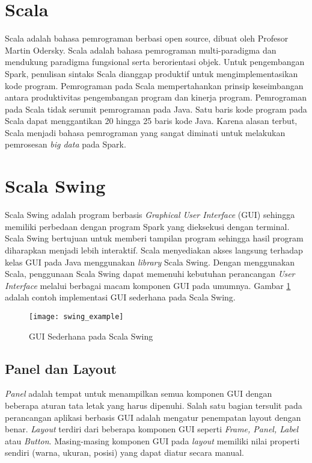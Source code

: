 \section{Scala}
\label{sec:scala}
Scala adalah bahasa pemrograman berbasi open source, dibuat oleh Profesor Martin Odersky. Scala adalah bahasa pemrograman multi-paradigma dan mendukung paradigma fungsional serta berorientasi objek. Untuk pengembangan Spark, penulisan sintaks Scala dianggap produktif untuk mengimplementasikan kode program. Pemrograman pada Scala mempertahankan prinsip keseimbangan antara produktivitas pengembangan program dan kinerja program. Pemrograman pada Scala tidak serumit pemrograman pada Java. Satu baris kode program pada Scala dapat menggantikan 20 hingga 25 baris kode Java. Karena alasan terbut, Scala menjadi bahasa pemrograman yang sangat diminati untuk melakukan pemrosesan \textit{big data} pada Spark.

\section{Scala Swing} 
Scala Swing adalah program berbasis \textit{Graphical User Interface} (GUI) sehingga memiliki perbedaan dengan program Spark yang dieksekusi dengan terminal. Scala Swing bertujuan untuk memberi tampilan program sehingga hasil program diharapkan menjadi lebih interaktif. Scala menyediakan akses langsung terhadap kelas GUI pada Java menggunakan \textit{library} Scala Swing.  Dengan menggunakan Scala, penggunaan Scala Swing dapat memenuhi kebutuhan perancangan \textit{User Interface} melalui berbagai macam komponen GUI pada umumnya. Gambar \ref{fig:swing_example} adalah contoh implementasi GUI sederhana pada Scala Swing.
\begin{figure}[H]
	\centering
	\texttt{[image: swing\_example]}
	\caption{GUI Sederhana pada Scala Swing}
	\label{fig:swing_example}
\end{figure}


\subsection{Panel dan Layout}
\textit{Panel} adalah tempat untuk menampilkan semua komponen GUI dengan beberapa aturan tata letak yang harus dipenuhi. Salah satu bagian tersulit pada perancangan aplikasi berbasis GUI adalah mengatur penempatan layout dengan benar. \textit{Layout} terdiri dari beberapa komponen GUI seperti \textit{Frame, Panel, Label} atau \textit{Button}. Masing-masing komponen GUI pada \textit{layout} memiliki nilai properti sendiri (warna, ukuran, posisi) yang dapat diatur secara manual.

